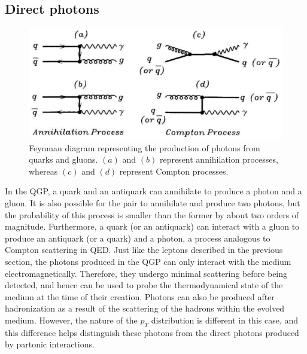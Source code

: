 \subsection{Direct photons}
\begin{figure}[h]
  \centering
  \includegraphics[width=6.5in]{figures/directPhotons.PNG}
  \caption{Feynman diagram representing the production of photons from quarks and gluons. $(a)$ and $(b)$ represent annihilation processes, whereas $(c)$ and $(d)$ represent Compton processes.\cite{wong1994introduction}}\label{fig:directPhotons}
\end{figure}

In the QGP, a quark and an antiquark can annihilate to produce a photon and a gluon. It is also possible for the pair to annihilate and produce two photons, but the probability of this process is smaller than the former by about two orders of magnitude. Furthermore, a quark (or an antiquark) can interact with a gluon to produce an antiquark (or a quark) and a photon, a process analogous to Compton scattering in QED. Just like the leptons described in the previous section, the photons produced in the QGP can only interact with the medium electromagnetically. Therefore, they undergo minimal scattering before being detected, and hence can be used to probe the thermodynamical state of the medium at the time of their creation.\cite{wong1994introduction} Photons can also be produced after hadronization as a result of the scattering of the hadrons within the evolved medium. However, the nature of the $p_{T}$ distribution is different in this case, and this difference helps distinguish these photons from the direct photons produced by partonic interactions.\cite{Wilde:2012wc}

